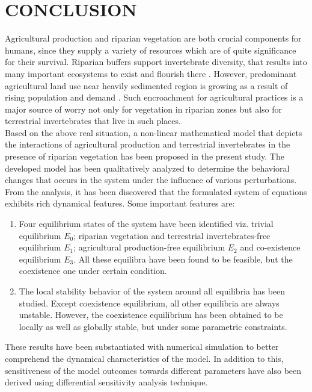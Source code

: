 \documentclass[12pt,a4wide]{report}
\numberwithin{equation}{chapter}
\numberwithin{theorem}{chapter}
\begin{document}
\chapter{CONCLUSION}
\vspace{-1cm}
 Agricultural production and riparian vegetation are both crucial components for humans, since they supply a variety of resources which are of quite significance for their survival. Riparian buffers support invertebrate diversity, that results into many important ecosystems to exist and flourish there \cite{popescu2021riparian}. However, predominant agricultural land use near heavily sedimented region is growing as a result of rising population and demand \citep{domnisoru2006}. Such encroachment for agricultural practices is a major source of worry not only for vegetation in riparian zones but also for terrestrial invertebrates that live in such places.\\
 Based on the above real situation, a non-linear mathematical model that depicts the interactions of agricultural production and terrestrial invertebrates in the presence of riparian vegetation has been proposed in the present study. The developed model has been qualitatively analyzed to determine the behavioral changes that occurs in the system under the influence of various perturbations. From the analysis, it has been discovered that the formulated system of equations exhibits rich dynamical features. Some important features are:
\begin{enumerate}
    \item Four equilibrium states of the system have been identified viz. trivial equilibrium $E_0$; riparian vegetation and terrestrial invertebrates-free equilibrium $E_1$; agricultural production-free equilibrium $E_2$ and  co-existence equilibrium $E_3$. All these equilibra have been found to be feasible, but the coexistence one under certain condition.
    \item The local stability behavior of the system around all equilibria has been studied. Except coexistence equilibrium, all other equilibria are always unstable. However, the coexistence equilibrium has been obtained to be locally as well as globally stable, but under some parametric constraints.
   \end{enumerate} 
   These results have been substantiated with numerical simulation to better comprehend the dynamical characteristics of the model.
   In addition to this, sensitiveness of the model outcomes towards different parameters have also been derived using differential sensitivity analysis technique. \\
\end{document}
